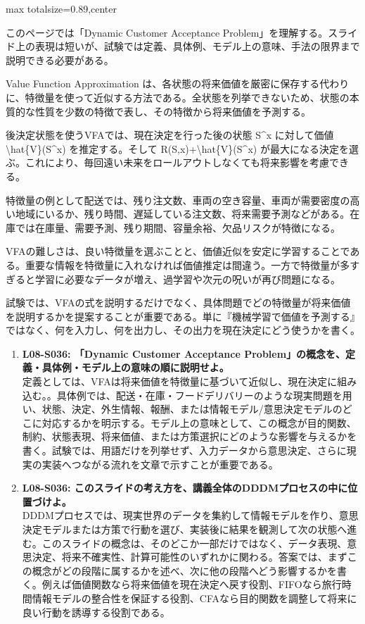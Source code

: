 \begin{minipage}[t]{0.58\textwidth}
\begin{adjustbox}{max totalsize={\textwidth}{0.89\textheight},center}
\begin{minipage}{\textwidth}\scriptsize
{}このページでは「Dynamic Customer Acceptance Problem」を理解する。スライド上の表現は短いが、試験では定義、具体例、モデル上の意味、手法の限界まで説明できる必要がある。\par
Value Function Approximation は、各状態の将来価値を厳密に保存する代わりに、特徴量を使って近似する方法である。全状態を列挙できないため、状態の本質的な性質を少数の特徴で表し、その特徴から将来価値を予測する。\par
後決定状態を使うVFAでは、現在決定を行った後の状態 S\textasciicircum{}x に対して価値 \textbackslash{}hat\{V\}(S\textasciicircum{}x) を推定する。そして R(S,x)+\textbackslash{}hat\{V\}(S\textasciicircum{}x) が最大になる決定を選ぶ。これにより、毎回遠い未来をロールアウトしなくても将来影響を考慮できる。\par
特徴量の例として配送では、残り注文数、車両の空き容量、車両が需要密度の高い地域にいるか、残り時間、遅延している注文数、将来需要予測などがある。在庫では在庫量、需要予測、残り期間、容量余裕、欠品リスクが特徴になる。\par
VFAの難しさは、良い特徴量を選ぶことと、価値近似を安定に学習することである。重要な情報を特徴量に入れなければ価値推定は間違う。一方で特徴量が多すぎると学習に必要なデータが増え、過学習や次元の呪いが再び問題になる。\par
試験では、VFAの式を説明するだけでなく、具体問題でどの特徴量が将来価値を説明するかを提案することが重要である。単に『機械学習で価値を予測する』ではなく、何を入力し、何を出力し、その出力を現在決定にどう使うかを書く。\par{}\begin{enumerate}\item \textbf{L08-S036: 「Dynamic Customer Acceptance Problem」の概念を、定義・具体例・モデル上の意味の順に説明せよ。}\\定義としては、VFAは将来価値を特徴量に基づいて近似し、現在決定に組み込む。。具体例では、配送・在庫・フードデリバリーのような現実問題を用い、状態、決定、外生情報、報酬、または情報モデル/意思決定モデルのどこに対応するかを明示する。モデル上の意味として、この概念が目的関数、制約、状態表現、将来価値、または方策選択にどのような影響を与えるかを書く。試験では、用語だけを列挙せず、入力データから意思決定、さらに現実の実装へつながる流れを文章で示すことが重要である。\item \textbf{L08-S036: このスライドの考え方を、講義全体のDDDMプロセスの中に位置づけよ。}\\DDDMプロセスでは、現実世界のデータを集約して情報モデルを作り、意思決定モデルまたは方策で行動を選び、実装後に結果を観測して次の状態へ進む。このスライドの概念は、そのどこか一部だけではなく、データ表現、意思決定、将来不確実性、計算可能性のいずれかに関わる。答案では、まずこの概念がどの段階に属するかを述べ、次に他の段階へどう影響するかを書く。例えば価値関数なら将来価値を現在決定へ戻す役割、FIFOなら旅行時間情報モデルの整合性を保証する役割、CFAなら目的関数を調整して将来に良い行動を誘導する役割である。\end{enumerate}

\end{minipage}
\end{adjustbox}
\end{minipage}
